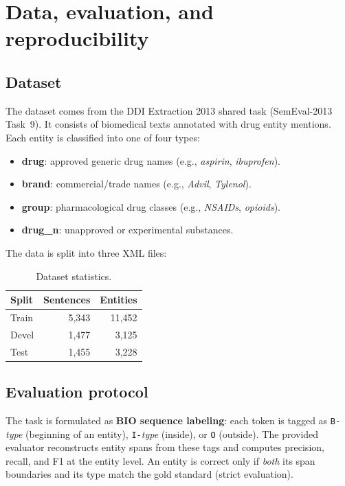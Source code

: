 \documentclass[a4paper,12pt]{article}
\begin{document}
\section{Data, evaluation, and reproducibility}

\subsection{Dataset}
The dataset comes from the DDI Extraction 2013 shared task (SemEval-2013 Task~9). It consists of biomedical texts annotated with drug entity mentions. Each entity is classified into one of four types:

\begin{itemize}[nosep]
    \item \textbf{drug}: approved generic drug names (e.g., \textit{aspirin}, \textit{ibuprofen}).
    \item \textbf{brand}: commercial/trade names (e.g., \textit{Advil}, \textit{Tylenol}).
    \item \textbf{group}: pharmacological drug classes (e.g., \textit{NSAIDs}, \textit{opioids}).
    \item \textbf{drug\_n}: unapproved or experimental substances.
\end{itemize}

The data is split into three XML files:

\begin{table}[H]
\centering
\begin{tabular}{l r r}
\hline
\textbf{Split} & \textbf{Sentences} & \textbf{Entities} \\
\hline
Train  & 5{,}343 & 11{,}452 \\
Devel  & 1{,}477 & 3{,}125 \\
Test   & 1{,}455 & 3{,}228 \\
\hline
\end{tabular}
\caption{Dataset statistics.}
\label{tab:dataset}
\end{table}

\subsection{Evaluation protocol}
The task is formulated as \textbf{BIO sequence labeling}: each token is tagged as \texttt{B-}\textit{type} (beginning of an entity), \texttt{I-}\textit{type} (inside), or \texttt{O} (outside). The provided evaluator reconstructs entity spans from these tags and computes precision, recall, and F1 at the entity level. An entity is correct only if \emph{both} its span boundaries and its type match the gold standard (strict evaluation).
\end{document}
